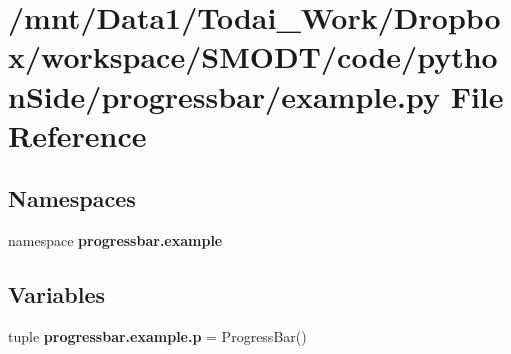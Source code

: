 \section{/mnt/\-Data1/\-Todai\-\_\-\-Work/\-Dropbox/workspace/\-S\-M\-O\-D\-T/code/python\-Side/progressbar/example.py File Reference}
\label{example_8py}
\subsection*{Namespaces}
\begin{DoxyCompactItemize}
\item 
namespace {\bf progressbar.\-example}
\end{DoxyCompactItemize}
\subsection*{Variables}
\begin{DoxyCompactItemize}
\item 
tuple {\bf progressbar.\-example.\-p} = Progress\-Bar()
\end{DoxyCompactItemize}
